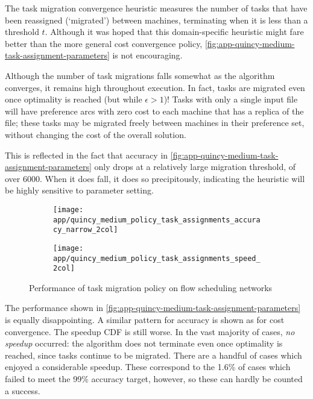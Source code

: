 The task migration convergence heuristic measures the number of tasks that have been reassigned (`migrated') between machines, terminating when it is less than a threshold $t$. Although it was hoped that this domain-specific heuristic might fare better than the more general cost convergence policy, \cref{fig:app-quincy-medium-task-assignment-parameters} is not encouraging. 

Although the number of task migrations falls somewhat as the algorithm converges, it remains high throughout execution. In fact, tasks are migrated even once optimality is reached (but while $\epsilon > 1$)! Tasks with only a single input file will have preference arcs with zero cost to each machine that has a replica of the file; these tasks may be migrated freely between machines in their preference set, without changing the cost of the overall solution.

This is reflected in the fact that accuracy in \cref{fig:app-quincy-medium-task-assignment-parameters} only drops at a relatively large migration threshold, of over $6000$. When it does fall, it does so precipitously, indicating the heuristic will be highly sensitive to parameter setting.

\begin{figure}
    \begin{widepage}
        \begin{subfigure}[c]{0.5\textwidth}
            \texttt{[image: app/quincy\_medium\_policy\_task\_assignments\_accuracy\_narrow\_2col]}
        \end{subfigure}
        \begin{subfigure}[c]{0.5\textwidth}
            \texttt{[image: app/quincy\_medium\_policy\_task\_assignments\_speed\_2col]}
        \end{subfigure}
    \end{widepage}
    \caption{Performance of task migration policy on flow scheduling networks}
    \label{fig:app-quincy-medium-task-assignment-cdf}
\end{figure}

The performance shown in \cref{fig:app-quincy-medium-task-assignment-parameters} is equally disappointing. A similar pattern for accuracy is shown as for cost convergence. The speedup CDF is still worse. In the vast majority of cases, \emph{no speedup} occurred: the algorithm does not terminate even once optimality is reached, since tasks continue to be migrated. There are a handful of cases which enjoyed a considerable speedup. These correspond to the 1.6\% of cases which failed to meet the 99\% accuracy target, however, so these can hardly be counted a success.

